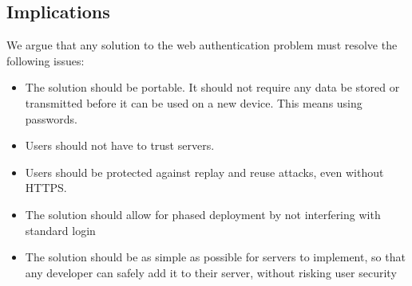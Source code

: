 \subsection{Implications}
We argue that any solution to the web authentication problem must resolve the following issues:

\begin{itemize}

    \item The solution should be portable. It should not require any data be stored or transmitted before it can be used on a new device. This means using passwords.

    \item Users should not have to trust servers.

    \item Users should be protected against replay and reuse attacks, even without HTTPS.

    \item The solution should allow for phased deployment by not interfering with standard login

    \item The solution should be as simple as possible for servers to implement, so that any developer can safely add it to their server, without risking user security

\end{itemize}
